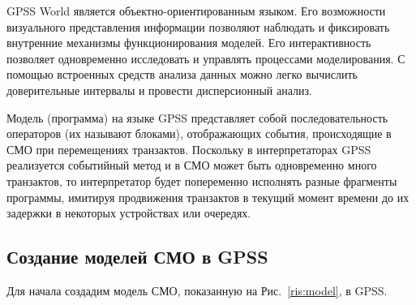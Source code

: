 \documentclass[a4paper,14pt]{report} %
\begin{document}
GPSS World является объектно-ориентированным языком. Его возможности визуального представления информации позволяют наблюдать и фиксировать внутренние механизмы функционирования моделей. Его интерактивность позволяет одновременно исследовать и управлять процессами моделирования. С помощью встроенных средств анализа данных можно легко вычислить доверительные интервалы и провести дисперсионный анализ.

Модель (программа) на языке GPSS представляет собой последовательность операторов (их называют блоками), отображающих события, происходящие в СМО при перемещениях транзактов. Поскольку в интерпретаторах GPSS реализуется событийный метод и в СМО может быть одновременно много транзактов, то интерпретатор будет попеременно исполнять разные фрагменты программы, имитируя продвижения транзактов в текущий момент времени до их задержки в некоторых устройствах или очередях.

\subsection{Создание моделей СМО в GPSS}
Для начала создадим модель СМО, показанную на Рис.~\ref{ris:model}, в GPSS.
\end{document}
